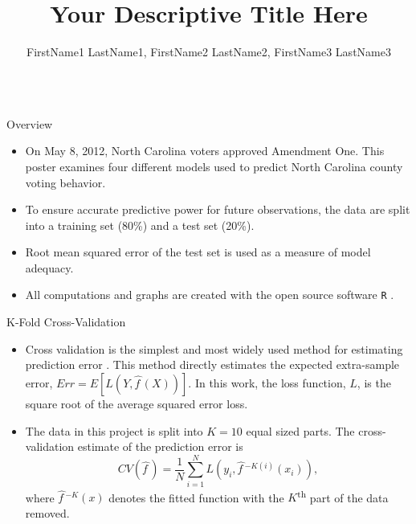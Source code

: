 \documentclass[final]{beamer}\usepackage[]{graphicx}\usepackage[]{color}
\title{Your Descriptive Title Here}
\author{FirstName1 LastName1, FirstName2 LastName2, FirstName3 LastName3}
\institute{Department of Mathematical Sciences}
\begin{document}
\begin{frame}[fragile]
\vspace{-2ex}
\begin{columns}[t]



\begin{column}{0.31\linewidth}
\begin{minipage}[t][.955\textheight]{\linewidth} 

\vspace{0ex}
\begin{block}{Overview}
\begin{itemize}
\item On May 8, 2012, North Carolina voters approved Amendment One.  This poster examines four different models used to predict North Carolina county voting behavior.  
\item To ensure accurate predictive power for future observations, the data are split into a training set (80\%) and a test set (20\%). 
\item Root mean squared error of the test set is used as a measure of model adequacy.  
\item All computations and graphs are created with the open source software \texttt{R} \cite{R-base}. 
\end{itemize}
\vspace{0ex}
\end{block}
\vfill

\begin{block}{K-Fold Cross-Validation}
\begin{itemize}
\item Cross validation is the simplest and most widely used method for estimating prediction error \cite{JF09}.  This method directly estimates the expected extra-sample error, $Err = E[{L(Y, \hat{f\,}\!(X))}]$.  In this work, the loss function, $L$, is the square root of the average squared error loss.
\vspace{2ex}
\item The data in this project is split into $K=10$ equal sized parts.  The cross-validation estimate of the prediction error is $$CV(\hat{f\,}\!)=\frac{1}{N}\sum_{i=1}^{N}L(y_i, \hat{f\,}\!^{-K(i)}(x_i)),$$
where $\hat{f\,}\!^{-K}(x)$ denotes the fitted function with the $K$\textsuperscript{th} part of the data removed.
\end{itemize}
\vspace{0ex}
\vfill
\end{block}
\vfill


\end{minipage}
\end{column}
\end{columns}
\end{frame}
\end{document}
